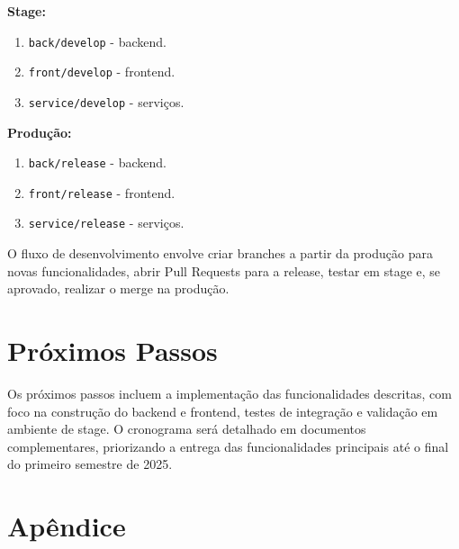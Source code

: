 \documentclass[12pt, a4paper]{article}
\begin{document}
\begin{spacing}{1.5}
\begin{spacing}{1.5}
\textbf{Stage:}
\begin{enumerate}[label=\alph*)]
    \item \texttt{back/develop} - backend.
    \item \texttt{front/develop} - frontend.
    \item \texttt{service/develop} - serviços.
\end{enumerate}

\textbf{Produção:}
\begin{enumerate}[label=\alph*)]
    \item \texttt{back/release} - backend.
    \item \texttt{front/release} - frontend.
    \item \texttt{service/release} - serviços.
\end{enumerate}

O fluxo de desenvolvimento envolve criar branches a partir da produção para novas funcionalidades, abrir Pull Requests para a release, testar em stage e, se aprovado, realizar o merge na produção.

\section{Próximos Passos}
\begin{spacing}{1.5}
Os próximos passos incluem a implementação das funcionalidades descritas, com foco na construção do backend e frontend, testes de integração e validação em ambiente de stage. O cronograma será detalhado em documentos complementares, priorizando a entrega das funcionalidades principais até o final do primeiro semestre de 2025.
\end{spacing}

\appendix
\section{Apêndice} %

\begin{enumerate}


\end{enumerate}
\end{spacing}
\end{spacing}
\end{document}
